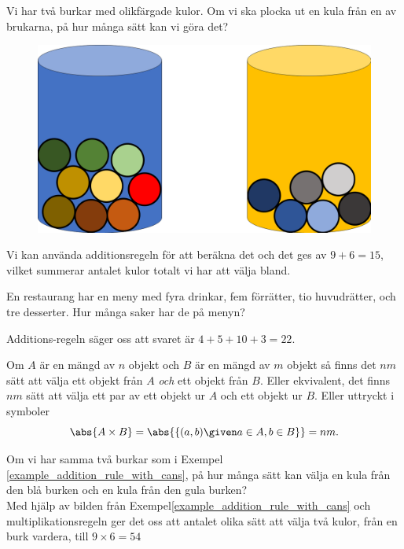 \documentclass{tufte-handout}
\begin{document}
\begin{example}\label{example_addition_rule_with_cans}
    Vi har två burkar med olikfärgade kulor. Om vi ska plocka ut en kula från en av brukarna, på hur många sätt kan vi göra det?
\begin{figure}[h]   
    \includegraphics{graphics/burkar med kulor.png}
\end{figure}

    Vi kan använda additionsregeln för att beräkna det och det ges av $9+6=15$, vilket summerar antalet kulor totalt vi har att välja bland.
\end{example}

\begin{example}\label{example_addition_rule}
En restaurang har en meny med fyra drinkar, fem förrätter, tio huvudrätter, och tre desserter. Hur många saker har de på menyn?

Additions-regeln säger oss att svaret är $4+5+10+3 = 22$.
\end{example}

\begin{definition}
	Om $A$ är en mängd av $n$ objekt och $B$ är en mängd av $m$ objekt så finns det $nm$ sätt att välja ett objekt från $A$ \emph{och} ett objekt från $B$. Eller ekvivalent, det finns $nm$ sätt att välja ett par av ett objekt ur $A$ och ett objekt ur $B$. Eller uttryckt i symboler
$$\abs{A\times B} = \abs{\{(a,b) \given a \in A, b \in B\}} = nm.$$
\end{definition}

\begin{example}
    Om vi har samma två burkar som i Exempel \ref{example_addition_rule_with_cans}, på hur många sätt kan välja en kula från den blå burken och en kula från den gula burken?\\
    Med hjälp av bilden från Exempel\ref{example_addition_rule_with_cans} och multiplikationsregeln ger det oss att antalet olika sätt att välja två kulor, från en burk vardera, till $9\times 6 = 54$   
\end{example}
\end{document}
